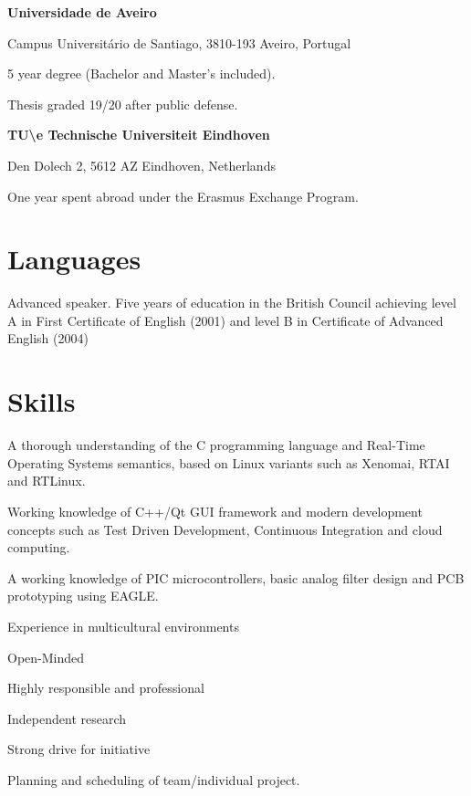 {
\textbf{Universidade de Aveiro}

Campus Universitário de Santiago, 3810-193 Aveiro, Portugal
}
{
5 year degree (Bachelor and Master's included).

Thesis graded 19/20 after public defense. 
}

\vspace{\baselineskip}

{
\textbf{TU\textbackslash e Technische Universiteit Eindhoven}

Den Dolech 2, 5612 AZ Eindhoven, Netherlands
}
{
One year spent abroad under the Erasmus Exchange Program.
}

\section*{Languages}

{
Advanced speaker. Five years of education in the British Council achieving
level A in First Certificate of English (2001) and level B in Certificate of
Advanced English (2004)
}


\section*{Skills}

{

A thorough understanding of the C programming language and Real-Time Operating
Systems semantics, based on Linux variants such as Xenomai, RTAI and RTLinux.

Working knowledge of C++/Qt GUI framework and modern development concepts such
as Test Driven Development, Continuous Integration and cloud computing.

}
{
A working knowledge of PIC microcontrollers, basic analog filter design and PCB prototyping using EAGLE.
}

{
Experience in multicultural environments

Open-Minded

Highly responsible and professional
}
{
Independent research

Strong drive for initiative

Planning and scheduling of team/individual project.
}



